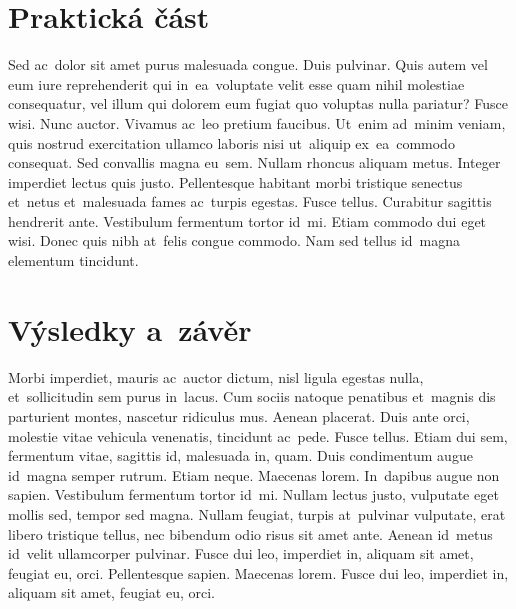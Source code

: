\section{Praktická část}
Sed ac~dolor sit amet purus malesuada congue. Duis pulvinar. Quis autem vel eum iure reprehenderit qui in~ea~voluptate velit esse quam nihil molestiae consequatur, vel illum qui dolorem eum fugiat quo voluptas nulla pariatur? Fusce wisi. Nunc auctor. Vivamus ac~leo pretium faucibus. Ut~enim ad~minim veniam, quis nostrud exercitation ullamco laboris nisi ut~aliquip ex~ea~commodo consequat. Sed convallis magna eu~sem. Nullam rhoncus aliquam metus. Integer imperdiet lectus quis justo. Pellentesque habitant morbi tristique senectus et~netus et~malesuada fames ac~turpis egestas. Fusce tellus. Curabitur sagittis hendrerit ante. Vestibulum fermentum tortor id~mi. Etiam commodo dui eget wisi. Donec quis nibh at~felis congue commodo. Nam sed tellus id~magna elementum tincidunt.

\section{Výsledky a~závěr}
Morbi imperdiet, mauris ac~auctor dictum, nisl ligula egestas nulla, et~sollicitudin sem purus in~lacus. Cum sociis natoque penatibus et~magnis dis parturient montes, nascetur ridiculus mus. Aenean placerat. Duis ante orci, molestie vitae vehicula venenatis, tincidunt ac~pede. Fusce tellus. Etiam dui sem, fermentum vitae, sagittis id, malesuada in, quam. Duis condimentum augue id~magna semper rutrum. Etiam neque. Maecenas lorem. In~dapibus augue non sapien. Vestibulum fermentum tortor id~mi. Nullam lectus justo, vulputate eget mollis sed, tempor sed magna. Nullam feugiat, turpis at~pulvinar vulputate, erat libero tristique tellus, nec bibendum odio risus sit amet ante. Aenean id~metus id~velit ullamcorper pulvinar. Fusce dui leo, imperdiet in, aliquam sit amet, feugiat eu, orci. Pellentesque sapien. Maecenas lorem. Fusce dui leo, imperdiet in, aliquam sit amet, feugiat eu, orci.

